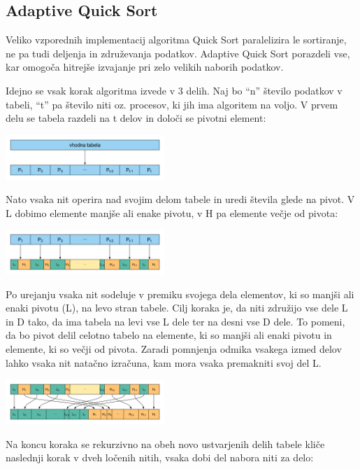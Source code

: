 \documentclass[journal,a4paper,twoside]{sty/IEEEtran}
\begin{document}
\subsection{Adaptive Quick Sort}

Veliko vzporednih implementacij algoritma Quick Sort paralelizira le sortiranje, ne pa tudi deljenja in združevanja podatkov.
Adaptive Quick Sort porazdeli vse, kar omogoča hitrejše izvajanje pri zelo velikih naborih podatkov.

Idejno se vsak korak algoritma izvede v 3 delih.
Naj bo “n” število podatkov v tabeli, “t” pa število niti oz. procesov, ki jih ima algoritem na voljo.
V prvem delu se tabela razdeli na t delov in določi se pivotni element:

\includegraphics[width=0.45\textwidth]{aqs_diag_1}

Nato vsaka nit operira nad svojim delom tabele in uredi števila glede na pivot.
V L dobimo elemente manjše ali enake pivotu, v H pa elemente večje od pivota:

\includegraphics[width=0.45\textwidth]{aqs_diag_2}

Po urejanju vsaka nit sodeluje v premiku svojega dela elementov, ki so manjši ali enaki pivotu (L), na levo stran tabele.
Cilj koraka je, da niti združijo vse dele L in D tako, da ima tabela na levi vse L dele ter na desni vse D dele.
To pomeni, da bo pivot delil celotno tabelo na elemente, ki so manjši ali enaki pivotu in elemente, ki so večji od pivota. 
Zaradi pomnjenja odmika vsakega izmed delov lahko vsaka nit natačno izračuna, kam mora vsaka premakniti svoj del L. 

\includegraphics[width=0.45\textwidth]{aqs_diag_3}

Na koncu koraka se rekurzivno na obeh novo ustvarjenih delih tabele kliče naslednji korak v dveh ločenih nitih, vsaka dobi del nabora niti za delo:
\end{document}
